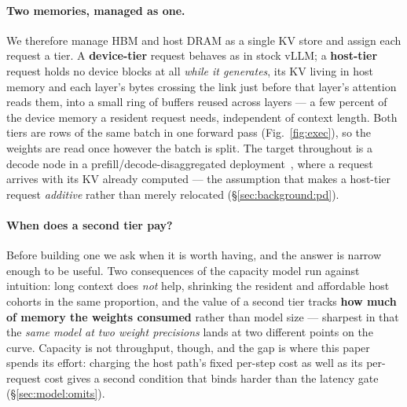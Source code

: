 \paragraph{Two memories, managed as one.} We therefore manage HBM and host DRAM as a
single KV store and assign each request a tier. A \textbf{device-tier} request
behaves as in stock vLLM; a \textbf{host-tier} request holds no device blocks at all
\emph{while it generates}, its KV living in host memory and each layer's bytes
crossing the link just before that layer's attention reads them, into a small ring of
buffers reused across layers --- a few percent of the device memory a resident
request needs, independent of context length. Both tiers are rows of the same batch
in one forward pass (Fig.~\ref{fig:exec}), so the weights are read once however the
batch is split. The target throughout is a decode node in a
prefill/decode-disaggregated deployment~\cite{distserve,splitwise,mooncake}, where a
request arrives with its KV already computed --- the assumption that makes a
host-tier request \emph{additive} rather than merely relocated
(\S\ref{sec:background:pd}).

\paragraph{When does a second tier pay?} Before building one we ask when it is
worth having, and the answer is narrow enough to be useful. Two consequences of the
capacity model run against intuition: long context does \emph{not} help, shrinking
the resident and affordable host cohorts in the same proportion, and the value of a
second tier tracks \textbf{how much of memory the weights consumed} rather than
model size --- sharpest in that the \emph{same model at two weight precisions} lands
at two different points on the curve. Capacity is not throughput, though, and the
gap is where this paper spends its effort: charging the host path's fixed per-step
cost as well as its per-request cost gives a second condition that binds harder than
the latency gate (\S\ref{sec:model:omits}).


